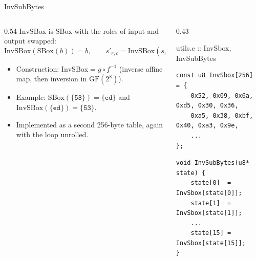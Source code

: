 \documentclass[aspectratio=169,10pt]{beamer}
\newcommand{\GF}{\mathrm{GF}(2^8)}
\newcommand{\fn}[1]{\mathrm{#1}}
\newcommand{\hx}[1]{\ensuremath{\mathtt{\{#1\}}}}            %
\begin{document}
\begin{frame}[fragile]{InvSubBytes}
\begin{columns}[T]
\begin{column}{0.54\textwidth}
\small
$\fn{InvSBox}$ is $\fn{SBox}$ with the roles of input and output swapped:
\[ \fn{InvSBox}(\fn{SBox}(b))=b,\qquad s'_{r,c}=\fn{InvSBox}(s_{r,c}) \]
\footnotesize
\begin{itemize}
\item Construction: $\fn{InvSBox}=g\circ f^{-1}$ (inverse affine map, then inversion in $\GF$).
\item Example: $\fn{SBox}(\hx{53})=\hx{ed}$ and $\fn{InvSBox}(\hx{ed})=\hx{53}$.
\item Implemented as a second 256-byte table, again with the loop unrolled.
\end{itemize}
\end{column}
\begin{column}{0.43\textwidth}
\begin{tbox}{utils.c :: InvSbox, InvSubBytes}
\begin{lstlisting}
const u8 InvSbox[256]  = {
    0x52, 0x09, 0x6a, 0xd5, 0x30, 0x36,
    0xa5, 0x38, 0xbf, 0x40, 0xa3, 0x9e,
    ...
};
\end{lstlisting}
\vskip3pt
\begin{lstlisting}
void InvSubBytes(u8* state) {
    state[0]  = InvSbox[state[0]];
    state[1]  = InvSbox[state[1]];
    ...
    state[15] = InvSbox[state[15]];
}
\end{lstlisting}
\end{tbox}
\end{column}
\end{columns}
\end{frame}
\end{document}
